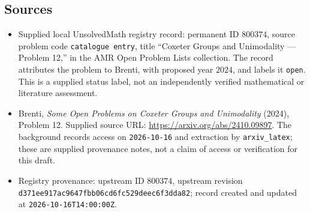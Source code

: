 \documentclass[11pt]{article}
\begin{document}
\subsection{Sources}
\begin{itemize}
\item Supplied local UnsolvedMath registry record: permanent ID \(800374\), source problem code \texttt{catalogue entry}, title ``Coxeter Groups and Unimodality --- Problem 12,'' in the AMR Open Problem Lists collection. The record attributes the problem to Brenti, with proposed year \(2024\), and labels it \texttt{open}. This is a supplied status label, not an independently verified mathematical or literature assessment.
\item Brenti, \emph{Some Open Problems on Coxeter Groups and Unimodality} (2024), Problem 12. Supplied source URL: \url{https://arxiv.org/abs/2410.09897}. The background records access on \texttt{2026-10-16} and extraction by \texttt{arxiv\_latex}; these are supplied provenance notes, not a claim of access or verification for this draft.
\item Registry provenance: upstream ID \(800374\), upstream revision \texttt{d371ee917ac9647fbb06cd6fc529deec6f3dda82}; record created and updated at \texttt{2026-10-16T14:00:00Z}.
\end{itemize}
\end{document}
